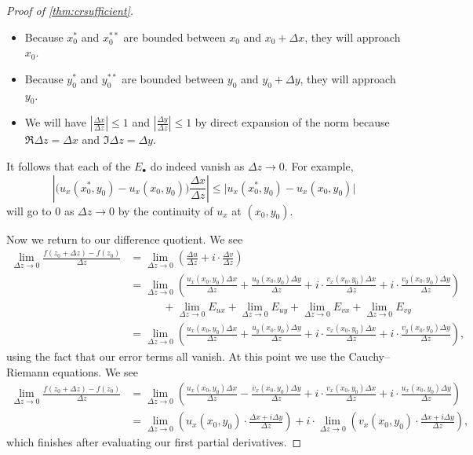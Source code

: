 \begin{proof}[Proof of \autoref{thm:crsufficient}]
\begin{itemize}
		\item Because $x_0^*$ and $x_0^{**}$ are bounded between $x_0$ and $x_0+\Delta x$, they will approach $x_0$.
		\item Because $y_0^*$ and $y_0^{**}$ are bounded between $y_0$ and $y_0+\Delta y$, they will approach $y_0$.
		\item We will have $\left|\frac{\Delta x}{\Delta z}\right|\le1$ and $\left|\frac{\Delta y}{\Delta z}\right|\le1$ by direct expansion of the norm because $\Re\Delta z=\Delta x$ and $\Im\Delta z=\Delta y$.
	\end{itemize}
	It follows that each of the $E_\bullet$ do indeed vanish as $\Delta z\to0$. For example,
	\[\left|\big(u_x(x_0^*,y_0)-u_x(x_0,y_0)\big)\frac{\Delta x}{\Delta z}\right|\le\big|u_x(x_0^*,y_0)-u_x(x_0,y_0)\big|\]
	will go to $0$ as $\Delta z\to0$ by the continuity of $u_x$ at $(x_0,y_0)$.

	Now we return to our difference quotient. We see
	\begin{align*}
		\lim_{\Delta z\to0}\frac{f(z_0+\Delta z)-f(z_0)}{\Delta z} &= \lim_{\Delta z\to0}\left(\frac{\Delta u}{\Delta z}+i\cdot\frac{\Delta v}{\Delta z}\right) \\
		&= \lim_{\Delta z\to0}\left(\frac{u_x(x_0,y_0)\Delta x}{\Delta z}+\frac{u_y(x_0,y_0)\Delta y}{\Delta z}+i\cdot\frac{v_x(x_0,y_0)\Delta x}{\Delta z}+i\cdot\frac{v_y(x_0,y_0)\Delta y}{\Delta z}\right) \\
		&\qquad\quad+\lim_{\Delta z\to0}E_{ux}+\lim_{\Delta z\to0}E_{uy}+\lim_{\Delta z\to0}E_{vx}+\lim_{\Delta z\to0}E_{vy} \\
		&= \lim_{\Delta z\to0}\left(\frac{u_x(x_0,y_0)\Delta x}{\Delta z}+\frac{u_y(x_0,y_0)\Delta y}{\Delta z}+i\cdot\frac{v_x(x_0,y_0)\Delta x}{\Delta z}+i\cdot\frac{v_y(x_0,y_0)\Delta y}{\Delta z}\right),
	\end{align*}
	using the fact that our error terms all vanish. At this point we use the Cauchy--Riemann equations. We see
	\begin{align*}
		\lim_{\Delta z\to0}\frac{f(z_0+\Delta z)-f(z_0)}{\Delta z} &= \lim_{\Delta z\to0}\left(\frac{u_x(x_0,y_0)\Delta x}{\Delta z}-\frac{v_x(x_0,y_0)\Delta y}{\Delta z}+i\cdot\frac{v_x(x_0,y_0)\Delta x}{\Delta z}+i\cdot\frac{u_x(x_0,y_0)\Delta y}{\Delta z}\right) \\
		&= \lim_{\Delta z\to0}\left(u_x(x_0,y_0)\cdot\frac{\Delta x+i\Delta y}{\Delta z}\right)+i\cdot\lim_{\Delta z\to0}\left(v_x(x_0,y_0)\cdot\frac{\Delta x+i\Delta y}{\Delta z}\right),
	\end{align*}
	which finishes after evaluating our first partial derivatives.
\end{proof}
